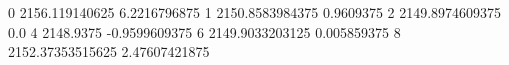 0 2156.119140625 6.2216796875
1 2150.8583984375 0.9609375
2 2149.8974609375 0.0
4 2148.9375 -0.9599609375
6 2149.9033203125 0.005859375
8 2152.37353515625 2.47607421875
